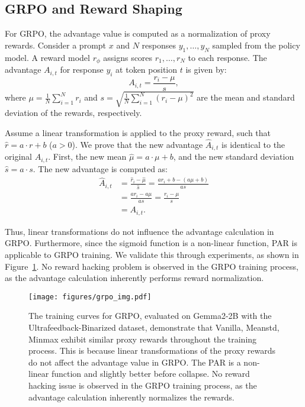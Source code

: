 \subsection{GRPO and Reward Shaping}
For GRPO, the advantage value is computed as a normalization of proxy rewards. Consider a prompt \( x \) and \( N \) responses \( y_1, \dots, y_N \) sampled from the policy model. A reward model \( r_\phi \) assigns scores \( r_1, \dots, r_N \) to each response. The advantage \( A_{i,t} \) for response \( y_i \) at token position \( t \) is given by:
\[
A_{i,t} = \frac{r_i - \mu}{s},
\]
where \( \mu = \frac{1}{N} \sum_{i=1}^N r_i \) and \( s = \sqrt{\frac{1}{N} \sum_{i=1}^N (r_i - \mu)^2 } \) are the mean and standard deviation of the rewards, respectively.

Assume a linear transformation is applied to the proxy reward, such that \( \hat{r} = a \cdot r + b \) (\( a > 0 \)). We prove that the new advantage \( \hat{A}_{i,t} \) is identical to the original \( A_{i,t} \). First, the new mean \( \hat{\mu} = a \cdot \mu + b \), and the new standard deviation \( \hat{s} = a \cdot s \). The new advantage is computed as:
\[
\begin{aligned}
\hat{A}_{i,t} &= \frac{\hat{r}_i - \hat{\mu}}{\hat{s}} = \frac{a r_i + b - (a \mu + b)}{a s} \\
&= \frac{a r_i - a \mu}{a s} = \frac{r_i - \mu}{s} \\
&= A_{i,t}.
\end{aligned}
\]

Thus, linear transformations do not influence the advantage calculation in GRPO. Furthermore, since the sigmoid function is a non-linear function, PAR is applicable to GRPO training. We validate this through experiments, as shown in Figure~\ref{fig:grpo}. No reward hacking problem is observed in the GRPO training process, as the advantage calculation inherently performs reward normalization.

\begin{figure}[H]
\centering
\texttt{[image: figures/grpo\_img.pdf]}

\caption{The training curves for GRPO, evaluated on Gemma2-2B with the Ultrafeedback-Binarized dataset, demonstrate that Vanilla, Meanstd, Minmax exhibit similar proxy rewards throughout the training process. This is because linear transformations of the proxy rewards do not affect the advantage value in GRPO. The PAR is a non-linear function and slightly better before collapse. No reward hacking issue is observed in the GRPO training process, as the advantage calculation inherently normalizes the rewards.}
\label{fig:grpo}
\end{figure}


